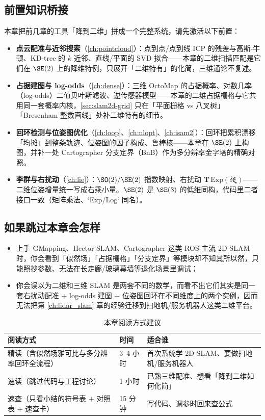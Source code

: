 \subsection*{前置知识桥接}
本章把前几章的工具「降到二维」拼成一个完整系统，请先激活以下前置：
\begin{itemize}
  \item \textbf{点云配准与近邻搜索}（\cref{ch:pointcloud}）：点到点/点到线 ICP 的残差与高斯-牛顿、KD-tree 的 $k$ 近邻、直线/平面的 SVD 拟合——本章的二维扫描匹配是它们在 $\SE(2)$ 上的降维特例，只展开「二维特有」的化简，三维通论不复述。
  \item \textbf{占据建图与 log-odds}（\cref{ch:dense}）：三维 OctoMap 的占据概率、对数几率（log-odds）二值贝叶斯滤波、逆传感器模型——本章的二维占据栅格与它共用同一套概率内核，\cref{sec:slam2d-grid} 只在「平面栅格 vs 八叉树」「Bresenham 整数画线」处补二维特有的细节。
  \item \textbf{回环检测与位姿图优化}（\cref{ch:loop}、\cref{ch:nlopt}、\cref{ch:isam2}）：回环把累积漂移「均摊」到整条轨迹、位姿图的因子构成、鲁棒核——本章在 $\SE(2)$ 上构图，并补一处 Cartographer 分支定界（BnB）作为多分辨率金字塔的精确对照。
  \item \textbf{李群与右扰动}（\cref{ch:lie}）：$\SO(2)/\SE(2)$ 指数映射、右扰动 $\mathbf{T}\,\mathrm{Exp}(\delta\boldsymbol{\xi})$——二维位姿增量统一写成右乘小量。$\SE(2)$ 是 $\SE(3)$ 的低维同构，代码里二者接口一致（矩阵乘法、`Exp/Log` 同名）。
\end{itemize}

\subsection*{如果跳过本章会怎样}
\begin{itemize}
  \item 上手 GMapping\cite{grisetti2007gmapping}、Hector SLAM\cite{kohlbrecher2011hector}、Cartographer\cite{hess2016cartographer} 这类 ROS 主流 2D SLAM 时，你会看到「似然场」「占据栅格」「分支定界」等模块却不知其所以然，只能照抄参数、无法在长走廊/玻璃幕墙等退化场景里调试；
  \item 你会误以为二维和三维 SLAM 是两套不同的数学，而看不出它们其实是同一套右扰动配准 + log-odds 建图 + 位姿图回环在不同维度上的两个实例，因而无法把第 \cref{ch:lidar_slam} 章的经验迁移到扫地机/服务机器人这类二维平台。
\end{itemize}

\begin{table}[H]\centering\small
\caption{本章阅读方式建议}
\label{tab:slam2d-reading}
\begin{tabular}{lll}
\toprule
阅读方式 & 时间 & 适合谁 \\
\midrule
精读（含似然场雅可比与多分辨率回环全流程） & 3--4 小时 & 首次系统学 2D SLAM、要做扫地机/服务机器人 \\
速读（跳过代码与工程讨论） & 1 小时 & 已熟三维配准、想看「降到二维如何化简」 \\
速查（只看小结的符号表 + 对照表 + 速查卡） & 15 分钟 & 写代码、调参时回来查公式 \\
\bottomrule
\end{tabular}
\end{table}

